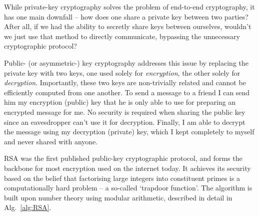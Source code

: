 While private-key cryptography solves the problem of end-to-end cryptography, it has one main downfall -- how does one share a private key between two parties? After all, if we had the ability to secretly share keys between ourselves, wouldn't we just use that method to directly communicate, bypassing the unnecessary cryptographic protocol?

Public- (or asymmetric-) key cryptography addresses this issue by replacing the private key with two keys, one used solely for \textit{encryption}, the other solely for \textit{decryption}. Importantly, these two keys are non-trivially related and cannot be efficiently computed from one another. To send a message to a friend I can send him my encryption (public) key that he is only able to use for preparing an encrypted message for me. No security is required when sharing the public key since an eavesdropper can't use it for decryption. Finally, I am able to decrypt the message using my decryption (private) key, which I kept completely to myself and never shared with anyone.

RSA \cite{bib:RSA} was the first published public-key cryptographic protocol, and forms the backbone for most encryption used on the internet today. It achieves its security based on the belief that factorising large integers into constituent primes is a computationally hard problem -- a so-called `trapdoor function'. The algorithm is built upon number theory using modular arithmetic, described in detail in Alg.~\ref{alg:RSA}.

